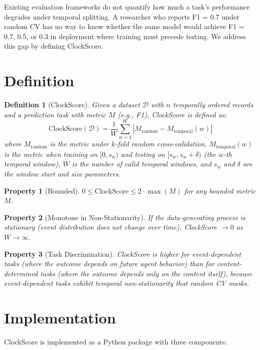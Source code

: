 \documentclass[sigconf,nonacm]{acmart}
\newtheorem{definition}{Definition}
\newtheorem{property}{Property}
\begin{document}
Existing evaluation frameworks do not quantify how much a task's performance degrades under temporal splitting. A researcher who reports F1 = 0.7 under random CV has no way to know whether the same model would achieve F1 = 0.7, 0.5, or 0.3 in deployment where training must precede testing. We address this gap by defining ClockScore.

\section{Definition}

\begin{definition}[ClockScore]
Given a dataset $\mathcal{D}$ with $n$ temporally ordered records and a prediction task with metric $M$ (e.g., F1), ClockScore is defined as:
\[
\text{ClockScore}(\mathcal{D}) = \frac{1}{W} \sum_{w=1}^{W} |M_{\text{random}} - M_{\text{temporal}}(w)|
\]
where $M_{\text{random}}$ is the metric under $k$-fold random cross-validation, $M_{\text{temporal}}(w)$ is the metric when training on $[0, s_w)$ and testing on $[s_w, s_w + \delta)$ (the $w$-th temporal window), $W$ is the number of valid temporal windows, and $s_w$ and $\delta$ are the window start and size parameters.
\end{definition}

\begin{property}[Bounded]
$0 \leq \text{ClockScore} \leq 2 \cdot \max(M)$ for any bounded metric $M$.
\end{property}

\begin{property}[Monotone in Non-Stationarity]
If the data-generating process is stationary (event distribution does not change over time), ClockScore $\to 0$ as $W \to \infty$.
\end{property}

\begin{property}[Task Discrimination]
ClockScore is higher for event-dependent tasks (where the outcome depends on future agent behavior) than for content-determined tasks (where the outcome depends only on the content itself), because event-dependent tasks exhibit temporal non-stationarity that random CV masks.
\end{property}

\section{Implementation}

ClockScore is implemented as a Python package with three components:
\end{document}
